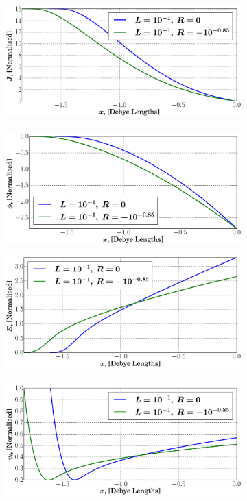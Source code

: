 \documentclass[aip,apl,reprint]{revtex4-1}
\begin{document}
	\begin{figure}
		\vspace{-1cm}
		\centering
		\begin{subfigure}[c]{\linewidth}
			\centering
			\includegraphics[width=0.44\linewidth]{0_-1l.eps}
			~
			\includegraphics[width=0.44\linewidth]{1_-1l.eps}
			
			\includegraphics[width=0.44\linewidth]{2_-1l.eps}
			~
			\includegraphics[width=0.44\linewidth]{3_-1l.eps}
			

\end{subfigure}
\end{figure}
\end{document}
